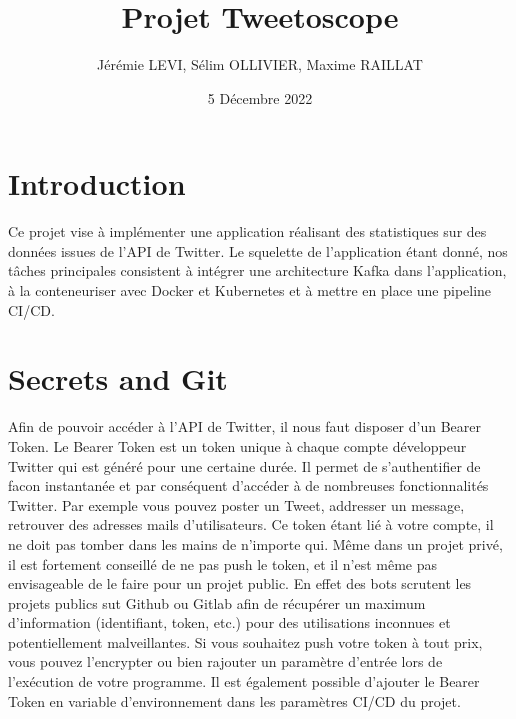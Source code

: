 \documentclass{article}
\title{Projet Tweetoscope}
\author{Jérémie LEVI, Sélim OLLIVIER, Maxime RAILLAT}
\date{5 Décembre 2022}
\begin{document}
\maketitle

\section{Introduction}
Ce projet vise à implémenter une application réalisant des statistiques sur des données issues de l'API de Twitter. Le squelette de l'application étant donné, nos tâches principales consistent à intégrer une architecture Kafka dans l'application, à la conteneuriser avec Docker et Kubernetes et à mettre en place une pipeline CI/CD.

\section{Secrets and Git}
Afin de pouvoir accéder à l'API de Twitter, il nous faut disposer d'un Bearer Token. Le Bearer Token est un token unique à chaque compte développeur Twitter qui est généré pour une certaine durée. Il permet de s'authentifier de facon instantanée et par conséquent d'accéder à de nombreuses fonctionnalités Twitter.
Par exemple vous pouvez poster un Tweet, addresser un message, retrouver des adresses mails d'utilisateurs. Ce token étant lié à votre compte, il ne doit pas tomber dans les mains de n'importe qui.
Même dans un projet privé, il est fortement conseillé de ne pas push le token, et il n'est même pas envisageable de le faire pour un projet public. En effet des bots scrutent les projets publics sut Github ou Gitlab afin de récupérer un maximum d'information (identifiant, token, etc.) pour des utilisations inconnues et potentiellement malveillantes. Si vous souhaitez push votre token à tout prix, vous pouvez l'encrypter ou bien rajouter un paramètre d'entrée lors de l'exécution de votre programme. Il est également possible d'ajouter le Bearer Token en variable d'environnement dans les paramètres CI/CD du projet.

\maketitle
\end{document}

